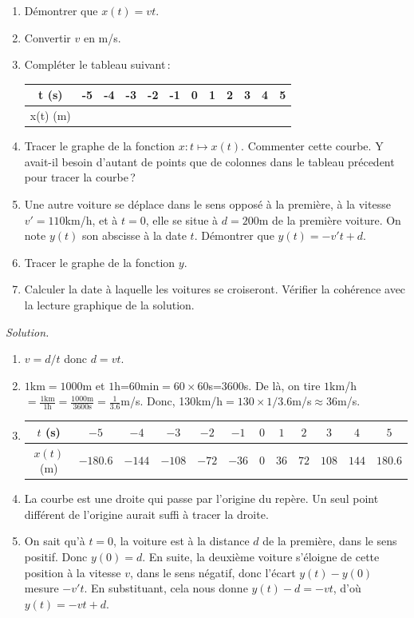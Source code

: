 			\begin{enumerate}
				\item Démontrer que $x(t)=v t$.
				\item Convertir $v$ en m/s.
				\item Compléter le tableau suivant\,:

				\begin{tabular}{c|c|c|c|c|c|c|c|c|c|c|c}
					t (s) & -5 & -4& -3& -2& -1& 0& 1& 2& 3& 4& 5 \\
					\hline
					x(t) (m)& &   &   &    &   &  &  &  &  &  &  
				\end{tabular}

				\item Tracer le graphe de la fonction $x:t\mapsto x(t)$. Commenter cette courbe. Y avait-il besoin d'autant de points que de colonnes dans le tableau précedent pour tracer la courbe\,?
				\item Une autre voiture se déplace dans le sens opposé à la première, à la vitesse\\ $v'=110$km/h, et à $t=0$, elle se situe à $d=200$m de la première voiture. On note $y(t)$ son abscisse à la date $t$. Démontrer que $y(t)=-v't+d$. 
				\item Tracer le graphe de la fonction $y$. 
				\item Calculer la date à laquelle les voitures se croiseront. Vérifier la cohérence avec la lecture graphique de la solution.


			\end{enumerate}

			\textit{Solution.} 
			\begin{enumerate}
				\item $v=d/t$ donc $d=vt$.
				\item $1$km$=1000$m et $1$h=$60$min$=60\times 60$s=$3600$s. De là, on tire $1$km/h $=\frac{1\text{km}}{1\text{h}}=\frac{1000\text{m}}{3600\text{s}}=\frac{1}{3.6}$m/s. Donc, 130km/h$=130\times 1/3.6$m/s$\approx 36$m/s.
				\item 

				\begin{tabular}{c|c|c|c|c|c|c|c|c|c|c|c}
					$t$ (s) &$     -5 $&$    -4$&$  -3 $&$   -2 $&$ -1$&$ 0$&$ 1 $&$  2 $&$ 3$&$ 4  $&$ 5 $\\
					\hline
					$x(t)$ (m)&$-180.6 $&$ -144 $&$-108 $&$ -72  $&$-36$&$ 0$&$ 36$&$ 72 $&$108$&$ 144 $& $180.6$ 
				\end{tabular}
				\item La courbe est une droite qui passe par l'origine du repère. Un seul point différent de l'origine aurait suffi à tracer la droite.
				\item On sait qu'à $t=0$, la voiture est à la distance $d$ de la première, dans le sens positif. Donc $y(0)=d$. En suite, la deuxième voiture s'éloigne de cette position à la vitesse $v$, dans le sens négatif, donc l'écart $y(t)-y(0)$ mesure $-v't$. En substituant, cela nous donne $y(t)-d=-vt$, d'où $y(t)=-vt+d$.

			\end{enumerate}


